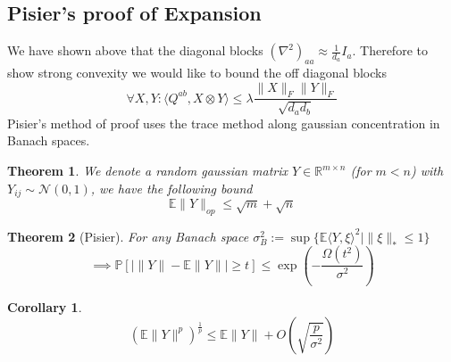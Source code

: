 \documentclass{article}
\newtheorem{theorem}{Theorem}
\newtheorem{corollary}{Corollary}
\newcommand{\R}{{\mathbb{R}}}
\newcommand{\E}{\mathbb{E}}
\renewcommand{\Pr}{\mathbb{P}}
\begin{document}
\subsection{Pisier's proof of Expansion}
We have shown above that the diagonal blocks $(\nabla^{2})_{aa} \approx \frac{1}{d_{a}} I_{a}$. Therefore to show strong convexity we would like to bound the off diagonal blocks 
\[ \forall X,Y:  \langle Q^{ab}, X \otimes Y \rangle \leq \lambda \frac{\|X\|_{F} \|Y\|_{F}}{\sqrt{d_{a} d_{b}}}   \]
Pisier's method of proof uses the trace method along gaussian concentration in Banach spaces. 

\begin{theorem}
We denote a random gaussian matrix $Y \in \R^{m \times n}$ (for $m < n$) with $Y_{ij} \sim \mathcal{N}(0,1)$, we have the following bound
\[ \E \|Y\|_{op} \leq \sqrt{m} + \sqrt{n} \]
\end{theorem}

% 

\begin{theorem} [Pisier]
For any Banach space $\sigma_{B}^{2} := \sup \{ \E \langle Y, \xi \rangle^{2} \mid \|\xi\|_{*} \leq 1 \} $
\[ \implies \Pr [ | \|Y\| - \E \|Y\| | \geq t ] \leq \exp \left( - \frac{\Omega(t^{2})}{\sigma^{2}} \right)   \]
\end{theorem}

\begin{corollary}
\[ (\E \|Y\|^{p})^{\frac{1}{p}} \leq \E \|Y\| + O \left( \sqrt{\frac{p}{\sigma^{2}}} \right)   \]
\end{corollary}
\end{document}
